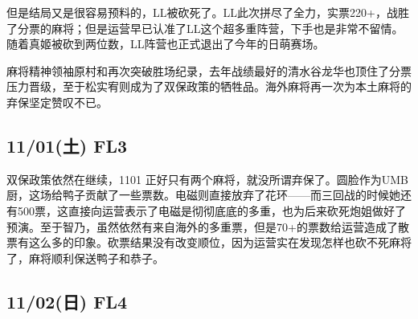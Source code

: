 但是结局又是很容易预料的，LL被砍死了。LL此次拼尽了全力，实票220+，战胜了分票的麻将；但是运营早已认准了LL这个超多重阵营，下手也是非常不留情。随着真姬被砍到两位数，LL阵营也正式退出了今年的日萌赛场。

麻将精神领袖原村和再次突破胜场纪录，去年战绩最好的清水谷龙华也顶住了分票压力晋级，至于松实宥则成为了双保政策的牺牲品。海外麻将再一次为本土麻将的弃保坚定赞叹不已。

\subsection{11/01(土) FL3}


双保政策依然在继续，1101 正好只有两个麻将，就没所谓弃保了。圆脸作为UMB厨，这场给鸭子贡献了一些票数。电磁则直接放弃了花环——而三回战的时候她还有500票，这直接向运营表示了电磁是彻彻底底的多重，也为后来砍死炮姐做好了预演。至于智乃，虽然依然有来自海外的多重票，但是70+的票数给运营造成了散票有这么多的印象。砍票结果没有改变顺位，因为运营实在发现怎样也砍不死麻将了，麻将顺利保送鸭子和恭子。

\subsection{11/02(日) FL4}



